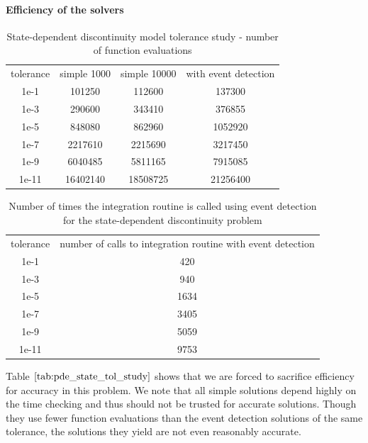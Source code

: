 \documentclass{article}
\begin{document}
\paragraph{Efficiency of the solvers}
\begin{table}[h]
\caption {State-dependent discontinuity model tolerance study - number of function evaluations} 
\label{tab:pde_state_tol_study}
\begin{center}
\begin{tabular}{ c c c c } 
tolerance & simple 1000 & simple 10000 & with event detection \\ 
1e-1      &             101250   &              112600   &   137300 \\
1e-3      &             290600   &              343410   &   376855 \\
1e-5      &             848080   &              862960   &  1052920 \\
1e-7      &            2217610     &           2215690   &  3217450\\
1e-9      &            6040485     &           5811165   &  7915085  \\
1e-11     &           16402140     &          18508725   & 21256400 \\
\end{tabular}
\end{center}
\end{table}

\begin{table}[h]
\caption {Number of times the integration routine is called using event detection for the state-dependent discontinuity problem} 
\label{tab:pde_state_tol_num_integrations}
\begin{center}
\begin{tabular}{ c c } 
tolerance & number of calls to integration routine with event detection \\ 
1e-1      &    420 \\
1e-3      &    940 \\
1e-5      & 1634 \\
1e-7      & 3405 \\
1e-9      & 5059 \\
1e-11     & 9753 \\
\end{tabular}
\end{center}
\end{table}

Table $\ref{tab:pde_state_tol_study}$ shows that we are forced to sacrifice efficiency for accuracy in this problem. We note that all simple solutions depend highly on the time checking and thus should not be trusted for accurate solutions. Though they use fewer function evaluations than the event detection solutions of the same tolerance, the solutions they yield are not even reasonably accurate. 
\end{document}
